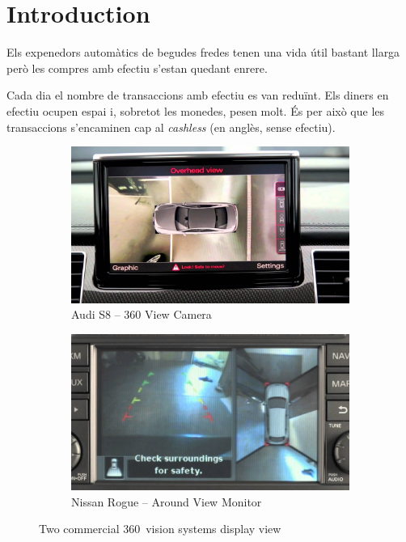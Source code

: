 \chapter{Introduction}

Els expenedors automàtics de begudes fredes tenen una vida útil bastant llarga però les compres amb efectiu s'estan quedant enrere.

Cada dia el nombre de transaccions amb efectiu es van reduïnt. Els diners en efectiu ocupen espai i, sobretot les monedes, pesen molt. És per això que les transaccions s'encaminen cap al \textit{cashless} (en anglès, sense efectiu).


\begin{figure}
	\centering
	\begin{subfigure}[b]{0.45\textwidth}
		\includegraphics[width=\textwidth]{images/audi-intro}
		\caption{Audi S8 -- 360 View Camera}
		\label{fig:audi-intro-example}
	\end{subfigure}
	\hspace{0.5cm}
	\begin{subfigure}[b]{0.45\textwidth}
		\includegraphics[width=\textwidth]{images/nissan-intro}
		\caption{Nissan Rogue -- Around View Monitor}
		\label{fig:nissan-intro-example}
	\end{subfigure}
	\caption{Two commercial 360\degree~vision systems display view}
	\label{fig:intro-example}
\end{figure}

